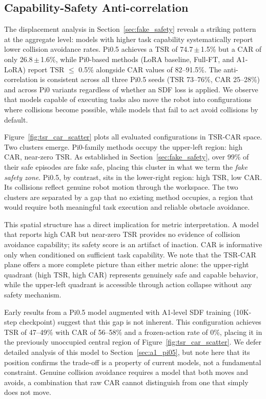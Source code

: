 \subsection{Capability-Safety Anti-correlation}\label{sec:tsr_car}

The displacement analysis in Section~\ref{sec:fake_safety} reveals a striking pattern at the aggregate level: models with higher task capability systematically report lower collision avoidance rates. Pi0.5 achieves a TSR of 74.7\,$\pm$\,1.5\% but a CAR of only 26.8\,$\pm$\,1.6\%, while Pi0-based methods (LoRA baseline, Full-FT, and A1-LoRA) report TSR $\leq$ 0.5\% alongside CAR values of 82--91.5\%. The anti-correlation is consistent across all three Pi0.5 seeds (TSR 73--76\%, CAR 25--28\%) and across Pi0 variants regardless of whether an SDF loss is applied. We observe that models capable of executing tasks also move the robot into configurations where collisions become possible, while models that fail to act avoid collisions by default.

Figure~\ref{fig:tsr_car_scatter} plots all evaluated configurations in TSR-CAR space. Two clusters emerge. Pi0-family methods occupy the upper-left region: high CAR, near-zero TSR. As established in Section~\ref{sec:fake_safety}, over 99\% of their safe episodes are fake safe, placing this cluster in what we term the \emph{fake safety zone}. Pi0.5, by contrast, sits in the lower-right region: high TSR, low CAR. Its collisions reflect genuine robot motion through the workspace. The two clusters are separated by a gap that no existing method occupies, a region that would require both meaningful task execution and reliable obstacle avoidance.

This spatial structure has a direct implication for metric interpretation. A model that reports high CAR but near-zero TSR provides no evidence of collision avoidance capability; its safety score is an artifact of inaction. CAR is informative only when conditioned on sufficient task capability. We note that the TSR-CAR plane offers a more complete picture than either metric alone: the upper-right quadrant (high TSR, high CAR) represents genuinely safe and capable behavior, while the upper-left quadrant is accessible through action collapse without any safety mechanism.

Early results from a Pi0.5 model augmented with A1-level SDF training (10K-step checkpoint) suggest that this gap is not inherent. This configuration achieves TSR of 47--49\% with CAR of 56--58\% and a frozen-action rate of 0\%, placing it in the previously unoccupied central region of Figure~\ref{fig:tsr_car_scatter}. We defer detailed analysis of this model to Section~\ref{sec:a1_pi05}, but note here that its position confirms the trade-off is a property of current models, not a fundamental constraint. Genuine collision avoidance requires a model that both moves and avoids, a combination that raw CAR cannot distinguish from one that simply does not move.
